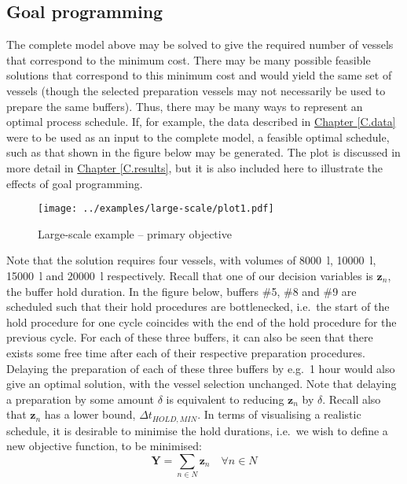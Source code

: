 \subsection{Goal programming}\label{SS.goal}
The complete model above may be solved to give the required number of vessels
that correspond to the minimum cost.
There may be many possible feasible solutions that correspond to this minimum
cost and would yield the same set of vessels (though the selected preparation
vessels may not necessarily be used to prepare the same buffers).
Thus, there may be many ways to represent an optimal process schedule.
If, for example, the data described in
\hyperref[C.data]{Chapter \ref*{C.data}} were to be used as an input to the
complete model, a feasible optimal schedule, such as that shown in the figure
below may be generated.
The plot is discussed in more detail in
\hyperref[C.results]{Chapter \ref*{C.results}}, but it is also included here to
illustrate the effects of goal programming.
\begin{figure}
    \centering
    \texttt{[image: ../examples/large-scale/plot1.pdf]}
    \caption{Large-scale example -- primary objective}
    \label{fig.primary}
\end{figure}
Note that the solution requires four vessels, with volumes of
\SI{8000}{\litre}, \SI{10000}{\litre}, \SI{15000}{\litre} and
\SI{20000}{\litre} respectively.  
Recall that one of our decision variables is $\boldsymbol{z}_{n}$, the buffer
hold duration.
In the figure below, buffers \#5, \#8 and \#9 are scheduled such that their 
hold procedures are bottlenecked, i.e.\ the start of the hold procedure for one
cycle coincides with the end of the hold procedure for the previous cycle.
For each of these three buffers, it can also be seen that there exists some
free time after each of their respective preparation procedures.
Delaying the preparation of each of these three buffers by e.g.\ 1 hour would
also give an optimal solution, with the vessel selection unchanged.
Note that delaying a preparation by some amount $\delta$ is equivalent to 
reducing $\boldsymbol{z}_{n}$ by $\delta$.
Recall also that $\boldsymbol{z}_{n}$ has a lower bound, 
$\Delta t_{\mathit{HOLD,MIN}}$.
In terms of visualising a realistic schedule, it is desirable to minimise the
hold durations, i.e.\ we wish to define a new objective function, to be
minimised:
\begin{equation}
    \boldsymbol{Y} = \sum_{n \in N} \boldsymbol{z}_{n} \quad \forall n \in N
    \label{eq.objfn2}
\end{equation}
